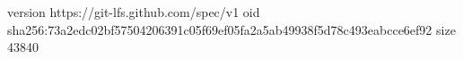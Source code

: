 version https://git-lfs.github.com/spec/v1
oid sha256:73a2edc02bf57504206391c05f69ef05fa2a5ab49938f5d78c493eabcce6ef92
size 43840
